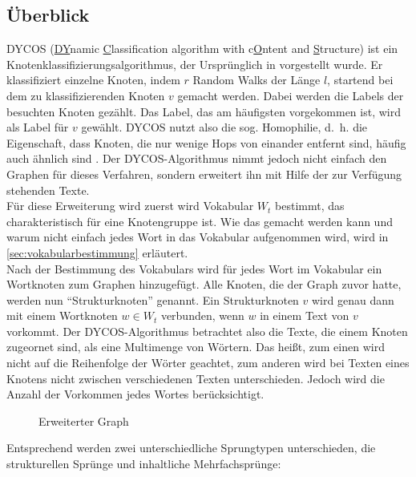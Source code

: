 \subsection{Überblick}
DYCOS (\underline{DY}namic \underline{C}lassification 
algorithm with c\underline{O}ntent and \underline{S}tructure) ist ein 
Knotenklassifizierungsalgorithmus, der Ursprünglich in \cite{aggarwal2011} vorgestellt 
wurde. Er klassifiziert einzelne Knoten, indem $r$ Random Walks der Länge $l$,
startend bei dem zu klassifizierenden Knoten $v$ gemacht werden. Dabei
werden die Labels der besuchten Knoten gezählt. Das Label, das am häufigsten
vorgekommen ist, wird als Label für $v$ gewählt.
DYCOS nutzt also die sog. Homophilie, d.~h. die Eigenschaft, dass
Knoten, die nur wenige Hops von einander entfernt sind, häufig auch
ähnlich sind \cite{bhagat}. Der DYCOS-Algorithmus nimmt jedoch nicht 
einfach den Graphen für dieses Verfahren, sondern erweitert ihn mit 
Hilfe der zur Verfügung stehenden Texte.\\
Für diese Erweiterung wird zuerst wird Vokabular $W_t$ bestimmt, das 
charakteristisch für eine Knotengruppe ist. Wie das gemacht werden kann
und warum nicht einfach jedes Wort in das Vokabular aufgenommen wird,
wird in \cref{sec:vokabularbestimmung} erläutert.\\
Nach der Bestimmung des Vokabulars wird für 
jedes Wort im Vokabular ein Wortknoten zum Graphen hinzugefügt. Alle
Knoten, die der Graph zuvor hatte, werden nun \enquote{Strukturknoten}
genannt.
Ein Strukturknoten $v$ wird genau dann mit einem Wortknoten $w \in W_t$
verbunden, wenn $w$ in einem Text von $v$ vorkommt.
Der DYCOS-Algorithmus betrachtet also die Texte, die einem Knoten 
zugeornet sind, als eine Multimenge von Wörtern. Das heißt, zum einen 
wird nicht auf die Reihenfolge der Wörter geachtet, zum anderen wird 
bei Texten eines Knotens nicht zwischen verschiedenen 
Texten unterschieden. Jedoch wird die Anzahl der Vorkommen 
jedes Wortes berücksichtigt.

\begin{figure}[htp]
    \centering
    
    \caption{Erweiterter Graph}
    \label{fig:erweiterter-graph}
\end{figure}

Entsprechend werden zwei unterschiedliche Sprungtypen unterschieden,
die strukturellen Sprünge und inhaltliche Mehrfachsprünge:


